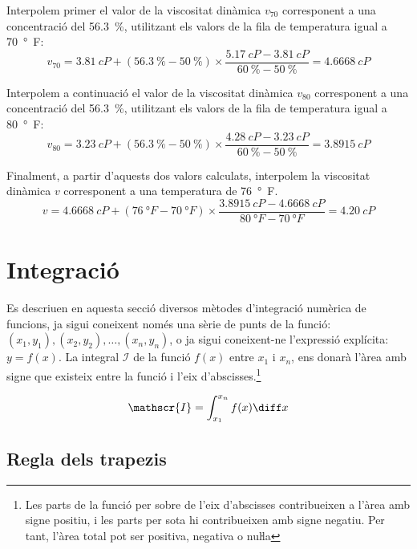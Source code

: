 \begin{exemple}
    Interpolem primer el valor de la viscositat dinàmica $v_{70}$ corresponent a una concentració del \qty{56,3}{\percent}, utilitzant els valors de la fila de temperatura igual a  \qty{70}{\degree F}:
    \[
         v_{70}=\qty{3,81}{cP}+(\qty{56,3}{\percent}-\qty{50}{\percent})\times
         \frac{\qty{5,17}{cP}-\qty{3,81}{cP}}{\qty{60}{\percent}-\qty{50}{\percent}}=\qty{4,6668}{cP}
    \]

    Interpolem a continuació el valor de la viscositat dinàmica $v_{80}$ corresponent a una concentració del \qty{56,3}{\percent}, utilitzant els valors de la fila de temperatura igual a  \qty{80}{\degree F}:
    \[
         v_{80} =\qty{3,23}{cP}+(\qty{56,3}{\percent}-\qty{50}{\percent})\times
         \frac{\qty{4,28}{cP}-\qty{3,23}{cP}}{\qty{60}{\percent}-\qty{50}{\percent}}=\qty{3,8915}{cP}
    \]

    Finalment, a partir d'aquests dos valors calculats, interpolem la viscositat dinàmica $v$ corresponent  a una temperatura de
    \qty{76}{\degree F}.
    \[
         v =\qty{4,6668}{cP}+(\qty{76}{\degree F}-\qty{70}{\degree F})\times
         \frac{\qty{3,8915}{cP}-\qty{4,6668}{cP}}{\qty{80}{\degree F}-\qty{70}{\degree F}}=\qty{4,20}{cP}
    \]

\end{exemple}

\section{Integració}\label{sec:int-mum}

Es descriuen en aquesta secció diversos mètodes d'integració numèrica de funcions, ja sigui coneixent només una sèrie de punts de la funció: $(x_1, y_1), (x_2, y_2), \dots ,(x_n, y_n)$, o ja sigui coneixent-ne l'expressió explícita: $y=f(x)$. La integral $\mathscr{I}$ de la funció $f(x)$ entre $x_1$ i $x_n$, ens donarà l'àrea amb signe que existeix entre la funció i l'eix d'abscisses.\footnote{Les parts de la funció per sobre de l'eix d'abscisses contribueixen a l'àrea amb signe positiu, i les parts per sota hi contribueixen amb signe negatiu. Per tant, l'àrea total pot ser positiva, negativa o nuŀla}

 \begin{equation}
    \mathscr{I} = \int_{x_1}^{x_n} f(x) \diff x
 \end{equation}

\subsection{Regla dels trapezis}
\label{sec:trapezis}

